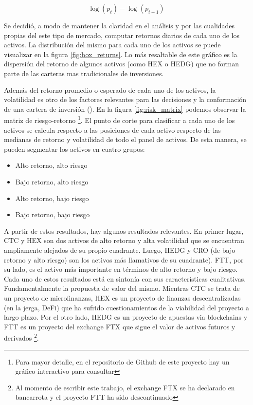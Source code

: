 \documentclass[runningheads,legalpaper,10pt]{etc/llncs}
\begin{document}
\[
\log(p_t) - \log(p_{t-1})
\]


Se decidió, a modo de mantener la claridad en el análisis y por las cualidades
propias del este tipo de mercado, computar retornos diarios de cada uno de los
activos. La distribución del mismo para cada uno de los activos se puede visualizar en la figura \ref{fig:box_returns}. Lo más resaltable de este gráfico es la dispersión del retorno de algunos activos (como HEX o HEDG) que no forman parte de las carteras mas tradicionales de inversiones.

Además del retorno promedio o esperado de cada uno de los activos, la volatilidad es otro de los factores relevantes para las decisiones  y la conformación de una cartera de inversión (\cite{randomwalkdownstreet}). En la figura \ref{fig:risk_matrix} podemos observar la matriz de riesgo-retorno \footnote{Para mayor detalle, en el repositorio de Github de este proyecto hay un gráfico interactivo para consultar}. El punto de corte para clasificar a cada uno de los activos se calcula respecto a las posiciones de cada activo respecto de las medianas de retorno y volatilidad de todo el panel de activos. De esta manera, se pueden segmentar los activos en cuatro grupos:

\begin{itemize}
    \item Alto retorno, alto riesgo
    \item Bajo retorno, alto riesgo
    \item Alto retorno, bajo riesgo
    \item Bajo retorno, bajo riesgo
\end{itemize}

A partir de estos resultados, hay algunos resultados relevantes. En primer lugar, CTC y HEX son dos activos de alto retorno y alta volatilidad que se encuentran ampliamente alejados de su propio cuadrante. Luego, HEDG y CRO (de bajo retorno y alto riesgo) son los activos más llamativos de su cuadrante). FTT, por su lado, es el activo más importante en términos de alto retorno y bajo riesgo. Cada uno de estos resultados está en sintonía con sus características cualitativas. Fundamentalmente la propuesta de valor del mismo. Mientras CTC se trata de un proyecto de microfinanzas, HEX es un proyecto de finanzas descentralizadas (en la jerga, DeFi) que ha sufrido cuestionamientos de la viabilidad del proyecto a largo plazo. Por el otro lado, HEDG es un proyecto de apuestas via blockchains y FTT es un proyecto del exchange FTX que sigue el valor de activos futuros y derivados \footnote{Al momento de escribir este trabajo, el exchange FTX se ha declarado en bancarrota y el proyecto FTT ha sido descontinuado}. 
\end{document}
